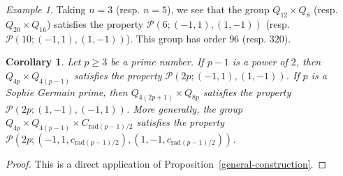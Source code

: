 \documentclass[12pt]{amsart}
\numberwithin{equation}{section}
\newtheorem{cor}[X]{Corollary}
\theoremstyle{definition}
\theoremstyle{remark}
\newtheorem*{exe}{Example}
\begin{document}
\begin{exe}
    Taking $n=3$ (resp. $n=5$), we see that the group $Q_{12}\times Q_8$ (resp. $Q_{20}\times Q_{16}$) satisfies the property $\mathcal{P}(6;(-1,1),(1,-1))$ (resp. $\mathcal{P}(10;(-1,1),(1,-1))$). This group has order $96$ (resp. $320$).
\end{exe}
\begin{cor}\label{corP(2p)}
    Let $p\ge 3$ be a prime number. If $p-1$ is a power of $2$, then $Q_{4p}\times Q_{4(p-1)}$ satisfies the property $\mathcal{P}(2p;(-1,1),(1,-1))$. If $p$ is a Sophie Germain prime, then $Q_{4(2p+1)}\times Q_{8p}$ satisfies the property $\mathcal{P}(2p;(1,-1),(-1,1))$. More generally, the group $Q_{4p}\times Q_{4(p-1)}\times C_{\mathrm{rad}(p-1)/2}$ satisfies the property $\mathcal{P}(2p; (-1,1,c_{\mathrm{rad}(p-1)/2}),(1,-1,c_{\mathrm{rad}(p-1)/2}))$.
\end{cor}

\begin{proof}
    This is a direct application of Proposition~\ref{general-construction}.
\end{proof}
\end{document}
